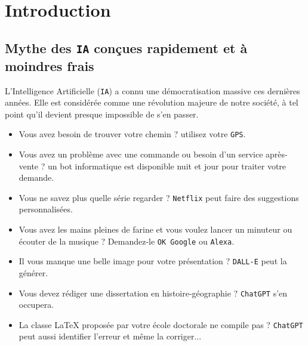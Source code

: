 \chapter{Introduction}
\label{chapter:1-INTRODUCTION}


	\section*{Mythe des \texttt{IA} conçues rapidement et à moindres frais}
		
		L'Intelligence Artificielle (\texttt{IA}) a connu une démocratisation massive ces dernières années.
		Elle est considérée comme une révolution majeure de notre société, à tel point qu'il devient presque impossible de s'en passer.
		\begin{itemize}
			\item Vous avez besoin de trouver votre chemin ? utilisez votre \texttt{GPS}.
			\item Vous avez un problème avec une commande ou besoin d'un service après-vente ? un bot informatique est disponible nuit et jour pour traiter votre demande.
			\item Vous ne savez plus quelle série regarder ? \texttt{Netflix} peut faire des suggestions personnalisées.
			\item Vous avez les mains pleines de farine et vous voulez lancer un minuteur ou écouter de la musique ? Demandez-le \texttt{OK Google} ou \texttt{Alexa}.
			\item Il vous manque une belle image pour votre présentation ? \texttt{DALL-E} peut la générer.
			\item Vous devez rédiger une dissertation en histoire-géographie ? \texttt{ChatGPT} s'en occupera.
			\item La classe \LaTeX{} proposée par votre école doctorale ne compile pas ? \texttt{ChatGPT} peut aussi identifier l'erreur et même la corriger...
		\end{itemize}
		
